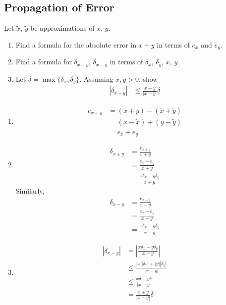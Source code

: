 \documentclass[fleqn, a4paper, 12pt, twoside]{article}
\theoremstyle{definition}
\theoremstyle{theorem}
\renewcommand{\tilde}{\widetilde}
\begin{document}
\subsection{Propagation of Error}

\begin{question}
	Let $\tilde{x}$, $\tilde{y}$ be approximations of $x$, $y$.
	\begin{enumerate}
		\item Find a formula for the absolute error in $x + y$ in terms of $e_x$ and $e_y$.
		\item Find a formula for $\delta_{x + y}$, $\delta_{x - y}$ in terms of $\delta_x$, $\delta_y$, $x$, $y$.
		\item
			Let $\delta = \max \{\delta_x,\delta_y\}$.
			Assuming $x,y > 0$, show
			\begin{align*}
				|\delta_{x - y}| & \le \frac{x + y}{|x - y|} \delta
			\end{align*}
	\end{enumerate}
\end{question}

\begin{solution}
	\begin{enumerate}[leftmargin=*]
		\item
			\begin{align*}
				e_{x + y} & = (x + y) - (\tilde{x} + \tilde{y}) \\
                                          & = (x - \tilde{x}) + (y - \tilde{y}) \\
                                          & = e_x + e_y
			\end{align*}
		\item
			\begin{align*}
				\delta_{x + y} & = \frac{e_{x + y}}{x + y} \\
                                               & = \frac{e_x + e_y}{x + y} \\
                                               & = \frac{x \delta_x + y \delta_y}{x + y}
			\end{align*}
			Similarly,
			\begin{align*}
				\delta_{x - y} & = \frac{e_{x - y}}{x - y} \\
                                               & = \frac{e_x - e_y}{x - y} \\
                                               & = \frac{x \delta_x - y \delta_y}{x - y}
			\end{align*}
		\item
			\begin{align*}
				|\delta_{x - y}| & = \left| \frac{x \delta_x - y \delta_y}{x - y} \right| \\
                                                 & \le \frac{|x| |\delta_x| + |y| |\delta_y|}{|x - y|}    \\
                                                 & \le \frac{x \delta + y \delta}{|x - y|}                \\
                                                 & = \frac{x + y}{|x - y|} \delta
			\end{align*}
	\end{enumerate}
\end{solution}
\end{document}
